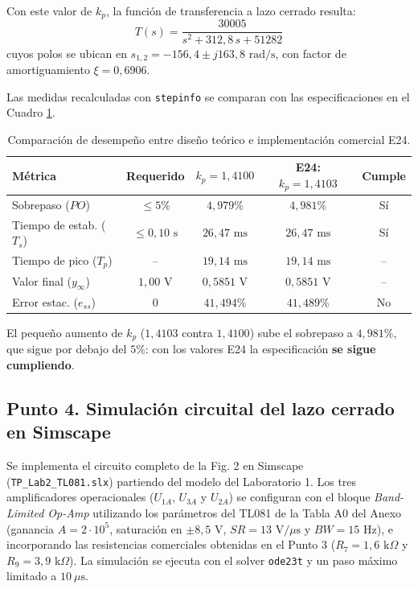 \documentclass[11pt,a4paper]{article}
\begin{document}
Con este valor de $k_p$, la función de transferencia a lazo cerrado resulta:
\begin{equation}
    T(s) = \frac{30005}{s^2 + 312{,}8\,s + 51282}
\end{equation}
cuyos polos se ubican en $s_{1,2} = -156{,}4 \pm j 163{,}8\text{ rad/s}$, con factor de amortiguamiento $\xi = 0{,}6906$.

Las medidas recalculadas con \texttt{stepinfo} se comparan con las especificaciones en el Cuadro \ref{tab:punto3_metricas}.

\begin{table}[H]
    \centering
    \caption{Comparación de desempeño entre diseño teórico e implementación comercial E24.}
    \vspace{2mm}
    \begin{tabular}{lcccc}
        \toprule
        \textbf{Métrica} & \textbf{Requerido} & \textbf{$k_p = 1{,}4100$} & \textbf{E24: $k_p = 1{,}4103$} & \textbf{Cumple} \\
        \midrule
        Sobrepaso ($PO$) & $\le 5\%$ & $4{,}979\%$ & $4{,}981\%$ & Sí \\
        Tiempo de estab. ($T_s$) & $\le 0{,}10\text{ s}$ & $26{,}47\text{ ms}$ & $26{,}47\text{ ms}$ & Sí \\
        Tiempo de pico ($T_p$) & -- & $19{,}14\text{ ms}$ & $19{,}14\text{ ms}$ & -- \\
        Valor final ($y_\infty$) & $1{,}00\text{ V}$ & $0{,}5851\text{ V}$ & $0{,}5851\text{ V}$ & -- \\
        Error estac. ($e_{ss}$) & $0$ & $41{,}494\%$ & $41{,}489\%$ & No \\
        \bottomrule
    \end{tabular}
    \label{tab:punto3_metricas}
\end{table}

El pequeño aumento de $k_p$ ($1{,}4103$ contra $1{,}4100$) sube el sobrepaso a $4{,}981\%$, que sigue por debajo del $5\%$: con los valores E24 la especificación \textbf{se sigue cumpliendo}.


\subsection*{Punto 4. Simulación circuital del lazo cerrado en Simscape}

Se implementa el circuito completo de la Fig. 2 en Simscape (\texttt{TP\_Lab2\_TL081.slx}) partiendo del modelo del Laboratorio 1. Los tres amplificadores operacionales ($U_{1A}$, $U_{3A}$ y $U_{2A}$) se configuran con el bloque \textit{Band-Limited Op-Amp} utilizando los parámetros del TL081 de la Tabla A0 del Anexo (ganancia $A = 2\cdot 10^5$, saturación en $\pm 8{,}5\text{ V}$, $SR = 13\text{ V}/\mu\text{s}$ y $BW = 15\text{ Hz}$), e incorporando las resistencias comerciales obtenidas en el Punto 3 ($R_7 = 1{,}6\text{ k}\Omega$ y $R_9 = 3{,}9\text{ k}\Omega$). La simulación se ejecuta con el solver \texttt{ode23t} y un paso máximo limitado a $10\ \mu\text{s}$.
\end{document}
